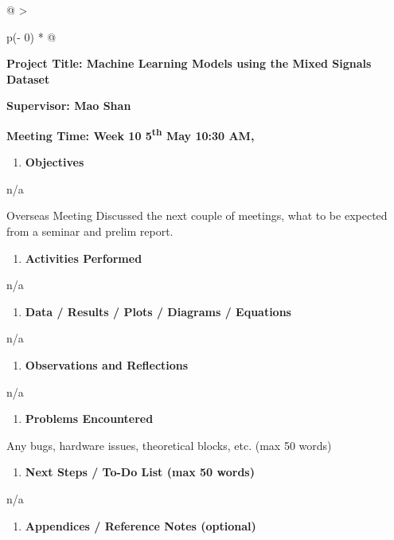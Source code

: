 \begin{longtable}[]{@{}
  >{\raggedright\arraybackslash}p{(\columnwidth - 0\tabcolsep) * }@{}}
\begin{minipage}[t]{\linewidth}
\textbf{Project Title: Machine Learning Models using the Mixed Signals
Dataset}

\textbf{Supervisor: Mao Shan}

\textbf{Meeting Time: Week 10 5\textsuperscript{th} May 10:30 AM,}

\begin{enumerate}
\def\labelenumi{\arabic{enumi}.}
\item
  \textbf{Objectives}
\end{enumerate}

n/a

Overseas Meeting Discussed the next couple of meetings, what to be
expected from a seminar and prelim report.

\begin{enumerate}
\def\labelenumi{\arabic{enumi}.}
\setcounter{enumi}{1}
\item
  \textbf{Activities Performed}
\end{enumerate}

n/a

\begin{enumerate}
\def\labelenumi{\arabic{enumi}.}
\setcounter{enumi}{2}
\item
  \textbf{Data / Results / Plots / Diagrams / Equations}
\end{enumerate}

n/a

\begin{enumerate}
\def\labelenumi{\arabic{enumi}.}
\setcounter{enumi}{3}
\item
  \textbf{Observations and Reflections}
\end{enumerate}

n/a

\begin{enumerate}
\def\labelenumi{\arabic{enumi}.}
\setcounter{enumi}{4}
\item
  \textbf{Problems Encountered}
\end{enumerate}

Any bugs, hardware issues, theoretical blocks, etc. (max 50 words)

\begin{enumerate}
\def\labelenumi{\arabic{enumi}.}
\setcounter{enumi}{5}
\item
  \textbf{Next Steps / To-Do List (max 50 words)}
\end{enumerate}

n/a

\begin{enumerate}
\def\labelenumi{\arabic{enumi}.}
\setcounter{enumi}{6}
\item
  \textbf{Appendices / Reference Notes (optional)}
\end{enumerate}


\end{minipage}
\end{longtable}
